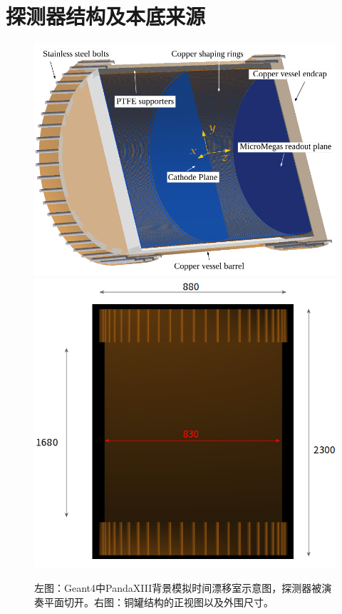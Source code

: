 \section{探测器结构及本底来源}
\begin{figure}[tbh]
    \centering
    \includegraphics[width=0.4\columnwidth]{pic/fig3.png}
    \includegraphics[width=0.4\columnwidth]{pic/fig5.png}
    \caption{左图：Geant4中PandaXIII背景模拟时间漂移室示意图\supercite{cnn}，探测器被演奏平面切开。右图：铜罐结构的正视图以及外围尺寸。}
    \label{fig:detector_bamboomc}
\end{figure}

